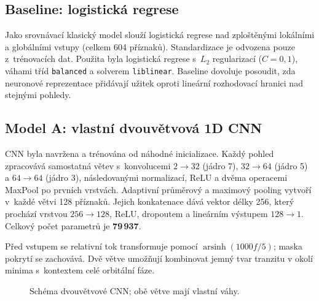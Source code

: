 \documentclass[11pt,a4paper]{article}
\newcommand{\code}[1]{\texttt{#1}}
\begin{document}
\subsection{Baseline: logistická regrese}
Jako srovnávací klasický model slouží logistická regrese nad zploštěnými lokálními a globálními vstupy (celkem 604 příznaků). Standardizace je odvozena pouze z~trénovacích dat. Použita byla logistická regrese s~$L_2$ regularizací ($C=0{,}1$), váhami tříd \code{balanced} a solverem \code{liblinear}. Baseline dovoluje posoudit, zda neuronové reprezentace přidávají užitek oproti lineární rozhodovací hranici nad stejnými pohledy.

\subsection{Model A: vlastní dvouvětvová 1D CNN}
CNN byla navržena a trénována od náhodné inicializace. Každý pohled zpracovává samostatná větev s~konvolucemi $2\!\rightarrow\!32$ (jádro 7), $32\!\rightarrow\!64$ (jádro 5) a $64\!\rightarrow\!64$ (jádro 3), následovanými normalizací, ReLU a dvěma operacemi MaxPool po prvních vrstvách. Adaptivní průměrový a maximový pooling vytvoří v~každé větvi 128 příznaků. Jejich konkatenace dává vektor délky 256, který prochází vrstvou $256\rightarrow128$, ReLU, dropoutem a lineárním výstupem $128\rightarrow1$. Celkový počet parametrů je \textbf{79\,937}.

Před vstupem se relativní tok transformuje pomocí $\operatorname{arsinh}(1000f/5)$; maska pokrytí se zachovává. Dvě větve umožňují kombinovat jemný tvar tranzitu v okolí minima s~kontextem celé orbitální fáze.

\begin{figure}[H]
\centering
{}
\caption{Schéma dvouvětvové CNN; obě větve mají vlastní váhy.}
\label{fig:architecture}
\end{figure}
\end{document}
